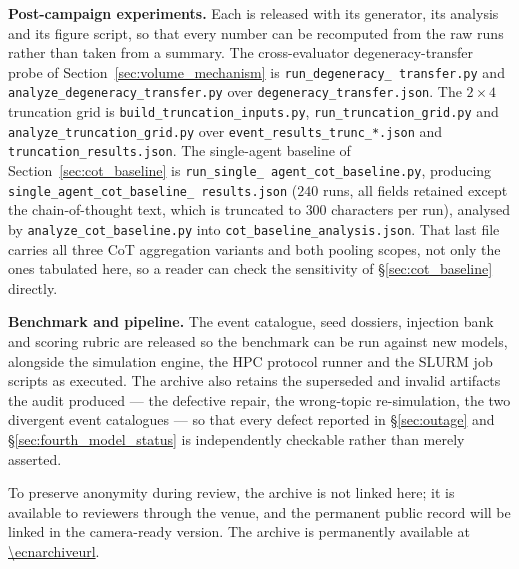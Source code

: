 \begin{sloppypar}
\textbf{Post-campaign experiments.} Each is released with its generator, its analysis and
its figure script, so that every number can be recomputed from the raw runs rather than
taken from a summary. The cross-evaluator degeneracy-transfer probe of
Section~\ref{sec:volume_mechanism} is \texttt{run\_\allowbreak degeneracy\_\allowbreak
transfer.py} and \texttt{analyze\_\allowbreak degeneracy\_\allowbreak transfer.py} over
\texttt{degeneracy\_\allowbreak transfer.json}. The $2\times4$ truncation grid is
\texttt{build\_\allowbreak truncation\_\allowbreak inputs.py},
\texttt{run\_\allowbreak truncation\_\allowbreak grid.py} and
\texttt{analyze\_\allowbreak truncation\_\allowbreak grid.py} over
\texttt{event\_\allowbreak results\_\allowbreak trunc\_*.json} and
\texttt{truncation\_\allowbreak results.json}. The single-agent baseline of
Section~\ref{sec:cot_baseline} is \texttt{run\_\allowbreak single\_\allowbreak
agent\_\allowbreak cot\_\allowbreak baseline.py}, producing
\texttt{single\_\allowbreak agent\_\allowbreak cot\_\allowbreak baseline\_\allowbreak
results.json} ($240$ runs, all fields retained except the chain-of-thought text, which
is truncated to $300$ characters per run), analysed by
\texttt{analyze\_\allowbreak cot\_\allowbreak baseline.py} into
\texttt{cot\_\allowbreak baseline\_\allowbreak analysis.json}. That last file carries all
three CoT aggregation variants and both pooling scopes, not only the ones tabulated
here, so a reader can check the sensitivity of \S\ref{sec:cot_baseline} directly.
\end{sloppypar}

\textbf{Benchmark and pipeline.} The event catalogue, seed dossiers, injection bank and
scoring rubric are released so the benchmark can be run against new models, alongside
the simulation engine, the HPC protocol runner and the SLURM job scripts as executed.
The archive also retains the superseded and invalid artifacts the audit produced --- the
defective repair, the wrong-topic re-simulation, the two divergent event catalogues ---
so that every defect reported in \S\ref{sec:outage} and \S\ref{sec:fourth_model_status}
is independently checkable rather than merely asserted.

\ifecnanonymous
To preserve anonymity during review, the archive is not linked here; it is available to
reviewers through the venue, and the permanent public record will be linked in the
camera-ready version.
\else
The archive is permanently available at \url{\ecnarchiveurl}.
\fi


